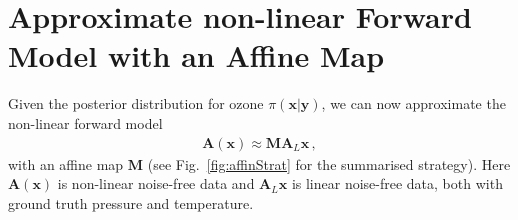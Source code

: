 %

\section{Approximate non-linear Forward Model with an Affine Map} 
\label{sec:affineMap}
Given the posterior distribution for ozone $ \pi(\bm{x}|\bm{y})$, we can now approximate the non-linear forward model 
\begin{align}
	\bm{A}(\bm{x}) \approx \bm{M A}_L \bm{x} \, ,
\end{align}
with an affine map $\bm{M}$ (see Fig.~\ref{fig:affinStrat} for the summarised strategy).
Here $\bm{A}(\bm{x})$ is non-linear noise-free data and $\bm{A}_L\bm{x}$ is linear noise-free data, both with ground truth pressure and temperature.

